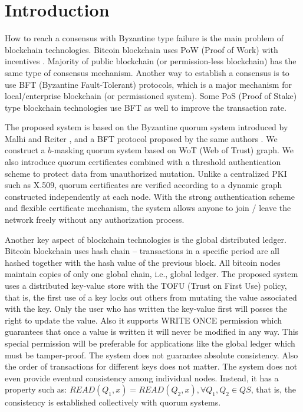 \section{Introduction}
How to reach a consensus with Byzantine type failure is the main
problem of blockchain technologies. Bitcoin blockchain uses PoW (Proof
of Work) with incentives \cite{bitcoin}. Majority of public blockchain
(or permission-less blockchain) has the same type of consensus
mechanism. Another way to establish a consensus is to use BFT
(Byzantine Fault-Tolerant) protocols, which is a major mechanism for
local/enterprise blockchain (or permissioned system). Some PoS (Proof
of Stake) type blockchain technologies use BFT as well to improve the
transaction rate.

The proposed system is based on the Byzantine quorum system introduced
by Malhi and Reiter \cite{Delhi:1}, and a BFT protocol proposed by the
same authors \cite{Delhi:2}. We construct a $b$-masking quorum system
based on WoT (Web of Trust) graph. We also introduce quorum
certificates combined with a threshold authentication scheme to
protect data from unauthorized mutation. Unlike a centralized PKI such
as X.509, quorum certificates are verified according to a dynamic
graph constructed independently at each node. With the strong
authentication scheme and flexible certificate mechanism, the system
allows anyone to join / leave the network freely without any
authorization process.

Another key aspect of blockchain technologies is the global
distributed ledger. Bitcoin blockchain uses hash chain -- transactions
in a specific period are all hashed together with the hash value of
the previous block. All bitcoin nodes maintain copies of only one
global chain, i.e., global ledger.
The proposed system uses a distributed key-value store with the TOFU
(Trust on First Use) policy, that is, the first use of a key locks out
others from mutating the value associated with the key. Only the
user who has written the key-value first will posses the right to
update the value. Also it supports WRITE ONCE permission which
guarantees that once a value is written it will never be modified in
any way. This special permission will be preferable for applications
like the global ledger which must be tamper-proof.
The system does not guarantee absolute consistency. Also the order of
transactions for different keys does not matter. The system does not
even provide eventual consistency among individual nodes. Instead, it
has a property such as: $READ(Q_1, x) = READ(Q_2, x), \forall Q_1, Q_2
\in QS$, that is, the consistency is established collectively with
quorum systems.

